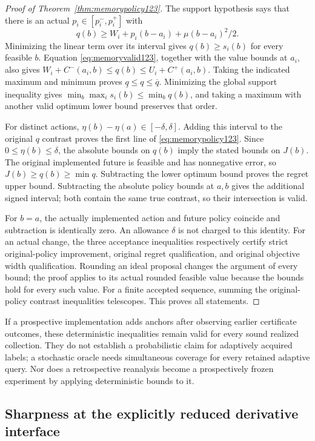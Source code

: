 \begin{proof}[Proof of Theorem~\ref{thm:memorypolicy123}]
The support hypothesis says that there is an actual
$p_i\in[p_i^-,p_i^+]$ with
\[
 q(b)\ge W_i+p_i(b-a_i)+\mu(b-a_i)^2/2.
\]
Minimizing the linear term over its interval gives
$q(b)\ge s_i(b)$ for every feasible $b$. Equation
\eqref{eq:memoryvalid123}, together with the value bounds at $a_i$,
also gives
$W_i+C^-(a_i,b)\le q(b)\le U_i+C^+(a_i,b)$.
Taking the indicated maximum and minimum proves
$\underline q\le q\le\overline q$. Minimizing the global
support inequality gives
$\min_b\max_i s_i(b)\le\min_b q(b)$, and taking a maximum
with another valid optimum lower bound preserves that order.

For distinct actions, $\eta(b)-\eta(a)\in[-\delta,\delta]$.
Adding this interval to the original $q$ contrast proves the first
line of \eqref{eq:memorypolicy123}. Since $0\le\eta(b)\le\delta$,
the absolute bounds on $q(b)$ imply the stated bounds on $J(b)$.
The original implemented future is feasible and has nonnegative
error, so $J(b)\ge q(b)\ge\min q$. Subtracting the lower optimum
bound proves the regret upper bound. Subtracting the absolute
policy bounds at $a,b$ gives the additional signed interval; both
contain the same true contrast, so their intersection is valid.

For $b=a$, the actually implemented action and future policy coincide
and subtraction is identically zero. An allowance $\delta$ is
not charged to this identity. For an actual change, the three
acceptance inequalities respectively certify strict original-policy
improvement, original regret qualification, and original objective
width qualification. Rounding an ideal proposal changes the
argument of every bound; the proof applies to its actual rounded
feasible value because the bounds hold for every such value.
For a finite accepted sequence, summing the original-policy contrast
inequalities telescopes. This proves all statements.
\end{proof}

If a prospective implementation adds anchors after observing earlier
certificate outcomes, these deterministic inequalities remain valid
for every sound realized collection. They do not establish a
probabilistic claim for adaptively acquired labels; a stochastic
oracle needs simultaneous coverage for every retained adaptive
query. Nor does a retrospective reanalysis become a prospectively
frozen experiment by applying deterministic bounds to it.

\subsection{Sharpness at the explicitly reduced derivative interface}

